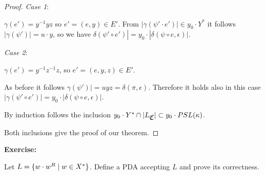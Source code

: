 \begin{proof}
{\em Case 1}:

$\gamma(e') = y^{-1}yz$ so $e' = (e, y) \in E'$. From $|\gamma(\psi' \cdot
e')| \in y_0 \cdot Y^*$ it follows $|\gamma(\psi')| = u \cdot y$, so we have
$\delta(\psi' \circ e')| = y_0 \cdot |\delta(\psi \circ e, \epsilon)|$.

{\em Case 2}:

$\gamma(e') = y^{-1} z^{-1} z$, so $e' = (e, y, z) \in E'$.

As before it follows $\gamma(\psi')| = uyz = \delta(\pi, \epsilon)$. Therefore
it holds also in this case $|\gamma(\psi' \circ e')| = y_0 \cdot |\delta(\psi
\circ e, \epsilon)|$.

By induction follows the inclusion $y_0 \cdot Y^* \cap |L_{\mbox{$\mathfrak{C}$}}| \subset y_0
\cdot PSL(\kappa)$.

Both inclusions give the proof of our theorem.
\end{proof}

{\bf Exercise:}

Let $L = \mbox{$\{ w \cdot w^R \mid w \in X^*\}$}$. Define a PDA accepting $L$ and
prove its correctness.
